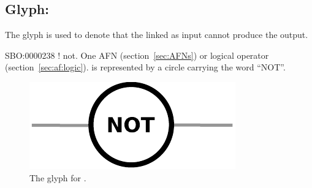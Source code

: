 \subsection{Glyph: }
\label{sec:af:not}

The glyph  is used to denote that the  linked as input cannot produce the output.

\begin{glyphDescription}
 \glyphSboTerm SBO:0000238 ! not.
 \glyphOrigin One AFN (section~\ref{sec:AFNs}) or logical operator (section~\ref{sec:af:logic}).
 \glyphTarget 
 \glyphNode {} is represented by a circle carrying the word ``NOT''.
 \end{glyphDescription}

\begin{figure}[H]
  \centering
  \includegraphics[scale = 0.5]{images/not}
  \caption{The \AF glyph for .}
  \label{fig:af:not}
\end{figure}
